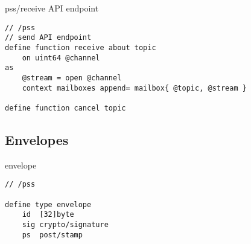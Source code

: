 \begin{definition}{pss/receive API endpoint}\label{def:receive}
\begin{lstlisting}[language=buzz1]
// /pss
// send API endpoint
define function receive about topic 
    on uint64 @channel
as 
    @stream = open @channel
    context mailboxes append= mailbox{ @topic, @stream }
    
define function cancel topic 
\end{lstlisting}
\end{definition}

\subsection{Envelopes}

\begin{definition}{envelope}\label{def:pss-envelope}
\begin{lstlisting}[language=buzz1]
// /pss

define type envelope
    id  [32]byte
    sig crypto/signature
    ps  post/stamp   
    
\end{lstlisting}
\end{definition}
